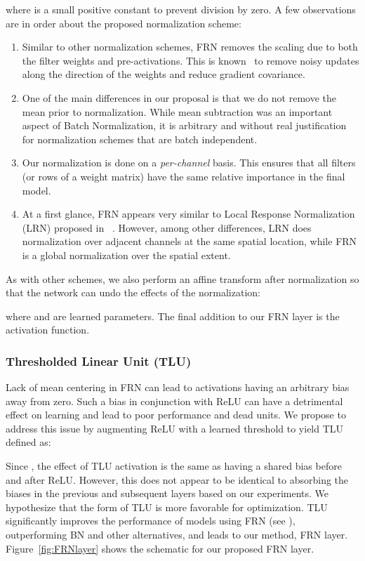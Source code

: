 \documentclass[10pt,twocolumn,letterpaper]{article}
\newcommand{\orelu}{TLU}
\newcommand{\relu}{ReLU}
\newcommand{\papername}{FRN}
\newcommand{\batchnorm}{BN}
\newcommand{\momentnorm}{FRN}
\begin{document}
where  is a small positive constant to prevent division by zero. A few observations are in order about the proposed normalization scheme:

\begin{enumerate}[leftmargin=*,noitemsep]
    \item Similar to other normalization schemes, FRN removes the scaling due to both the filter weights and pre-activations. This is known~\cite{salimans2016weight} to remove noisy updates along the direction of the weights and reduce gradient covariance.
    \item One of the main differences in our proposal is that we do not remove the mean prior to normalization. While mean subtraction was an important aspect of Batch Normalization, it is arbitrary and without real justification for normalization schemes that are batch independent.
    \item Our normalization is done on a \emph{per-channel} basis. This ensures that all filters (or rows of a weight matrix) have the same relative importance in the final model.
    \item At a first glance, FRN appears very similar to Local Response Normalization (LRN) proposed in ~\citet{Alexnet2012}. However, among other differences, LRN does normalization over adjacent channels at the same spatial location, while FRN is a global normalization over the spatial extent.
\end{enumerate}



As with other schemes, we also perform an affine transform after normalization so that the network can undo the effects of the normalization:

where  and  are learned parameters. The final addition to our \papername{} layer is the activation function. 

\subsubsection{Thresholded Linear Unit (\orelu{})}
\label{sec:offsetrelu}

Lack of mean centering in FRN can lead to activations having an arbitrary bias away from zero. Such a bias in conjunction with ReLU can have a detrimental effect on learning and lead to poor performance and dead units. We propose to address this issue by augmenting ReLU with a learned threshold  to yield \orelu{} defined as:

Since , the effect of \orelu{} activation is the same as having a shared bias before and after \relu{}. However, this does not appear to be identical to absorbing the biases in the previous and subsequent layers based on our experiments. We hypothesize that the form of \orelu{} is more favorable for optimization. \orelu{} significantly improves the performance of models using \momentnorm{} (see ), outperforming \batchnorm{} and other alternatives, and leads to our method, \papername{} layer. Figure~\ref{fig:FRNlayer} shows the schematic for our proposed \papername{} layer.
\end{document}
